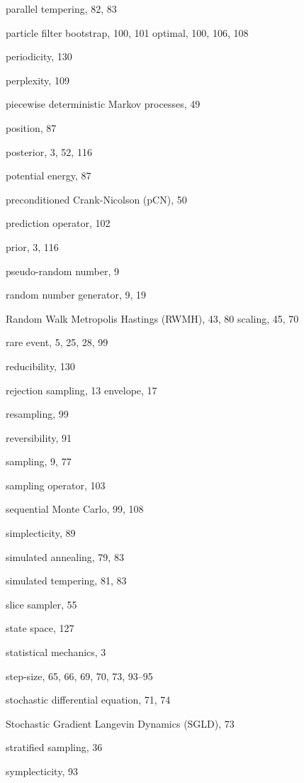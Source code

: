 \begin{theindex}
\item parallel tempering, 82, 83
\item particle filter
  \subitem bootstrap, 100, 101
  \subitem optimal, 100, 106, 108
\item periodicity, 130
\item perplexity, 109
\item piecewise deterministic Markov processes, 49
\item position, 87
\item posterior, 3, 52, 116
\item potential energy, 87
\item preconditioned Crank-Nicolson (pCN), 50
\item prediction operator, 102
\item prior, 3, 116
\item pseudo-random number, 9

\indexspace

\item random number generator, 9, 19
\item Random Walk Metropolis Hastings (RWMH), 43, 80
  \subitem scaling, 45, 70
\item rare event, 5, 25, 28, 99
\item reducibility, 130
\item rejection sampling, 13
  \subitem envelope, 17
\item resampling, 99
\item reversibility, 91

\indexspace

\item sampling, 9, 77
\item sampling operator, 103
\item sequential Monte Carlo, 99, 108
\item simplecticity, 89
\item simulated annealing, 79, 83
\item simulated tempering, 81, 83
\item slice sampler, 55
\item state space, 127
\item statistical mechanics, 3
\item step-size, 65, 66, 69, 70, 73, 93--95
\item stochastic differential equation, 71, 74
\item Stochastic Gradient Langevin Dynamics (SGLD), 73
\item stratified sampling, 36
\item symplecticity, 93


\end{theindex}
